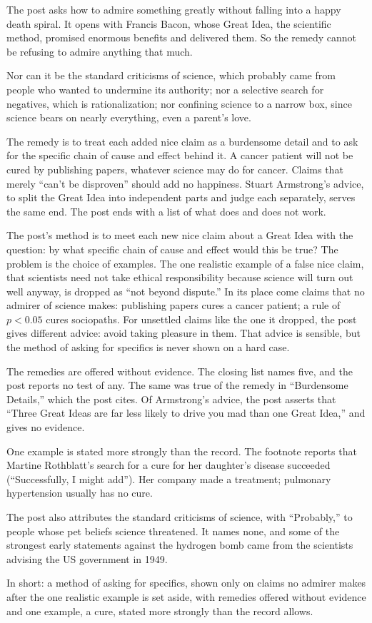 \begin{afterword}
\summaryhead

The post asks how to admire something greatly without falling into a happy death spiral. It opens with Francis Bacon, whose Great Idea, the scientific method, promised enormous benefits and delivered them. So the remedy cannot be refusing to admire anything that much.

Nor can it be the standard criticisms of science, which probably came from people who wanted to undermine its authority; nor a selective search for negatives, which is rationalization; nor confining science to a narrow box, since science bears on nearly everything, even a parent's love.

The remedy is to treat each added nice claim as a burdensome detail and to ask for the specific chain of cause and effect behind it. A cancer patient will not be cured by publishing papers, whatever science may do for cancer. Claims that merely ``can't be disproven'' should add no happiness. Stuart Armstrong's advice, to split the Great Idea into independent parts and judge each separately, serves the same end. The post ends with a list of what does and does not work.

\responsehead

The post's method is to meet each new nice claim about a Great Idea with the question: by what specific chain of cause and effect would this be true? The problem is the choice of examples. The one realistic example of a false nice claim, that scientists need not take ethical responsibility because science will turn out well anyway, is dropped as ``not beyond dispute.'' In its place come claims that no admirer of science makes: publishing papers cures a cancer patient; a rule of $p < 0.05$ cures sociopaths. For unsettled claims like the one it dropped, the post gives different advice: avoid taking pleasure in them. That advice is sensible, but the method of asking for specifics is never shown on a hard case.

The remedies are offered without evidence. The closing list names five, and the post reports no test of any. The same was true of the remedy in ``Burdensome Details,'' which the post cites. Of Armstrong's advice, the post asserts that ``Three Great Ideas are far less likely to drive you mad than one Great Idea,'' and gives no evidence.

One example is stated more strongly than the record. The footnote reports that Martine Rothblatt's search for a cure for her daughter's disease succeeded (``Successfully, I might add''). Her company made a treatment; pulmonary hypertension usually has no cure.

The post also attributes the standard criticisms of science, with ``Probably,'' to people whose pet beliefs science threatened. It names none, and some of the strongest early statements against the hydrogen bomb came from the scientists advising the US government in 1949.

In short: a method of asking for specifics, shown only on claims no admirer makes after the one realistic example is set aside, with remedies offered without evidence and one example, a cure, stated more strongly than the record allows.
\end{afterword}
